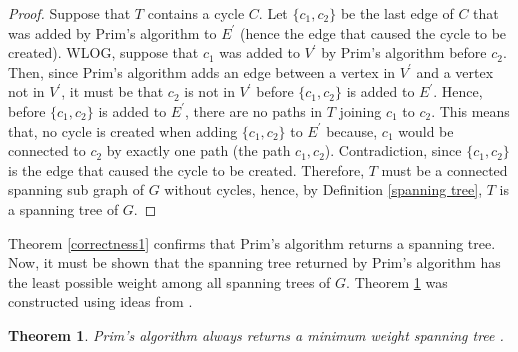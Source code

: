 \documentclass[12pt]{article}
\newtheorem{theorem}[definition]{Theorem}
\numberwithin{equation}{subsection}
\numberwithin{table}{subsection}
\numberwithin{algorithm}{subsection}
\numberwithin{figure}{subsection}
\begin{document}
\begin{proof}
Suppose that $T$ contains a cycle $C$. Let $\{c_1, c_2\}$ be the last edge of $C$ that was added by Prim's algorithm to $E^\prime$ (hence the edge that caused the cycle to be created). WLOG, suppose that $c_1$ was added to $V^\prime$ by Prim's algorithm before $c_2$. Then, since Prim's algorithm adds an edge between a vertex in $V^\prime$ and a vertex not in $V^\prime$, it must be that $c_2$ is not in $V^\prime$ before $\{c_1, c_2\}$ is added to $E^\prime$. Hence, before $\{c_1, c_2\}$ is added to $E^\prime$, there are no paths in $T$ joining $c_1$ to $c_2$. This means that, no cycle is created when adding $\{c_1, c_2\}$ to $E^\prime$ because, $c_1$ would be connected to $c_2$ by exactly one path (the path $c_1, c_2$). Contradiction, since $\{c_1, c_2\}$ is the edge that caused the cycle to be created. Therefore, $T$ must be a connected spanning sub graph of $G$ without cycles, hence, by Definition \ref{spanning tree}, $T$ is a spanning tree of $G$.
\end{proof}
Theorem \ref{correctness1} confirms that Prim's algorithm returns a spanning tree. Now, it must be shown that the spanning tree returned by Prim's algorithm has the least possible weight among all spanning trees of $G$. Theorem \ref{correctness2} was constructed using ideas from \cite{prim's_algorithm}.
\begin{theorem}
Prim's algorithm always returns a minimum weight spanning tree {}.
\label{correctness2}
\end{theorem}
\end{document}
